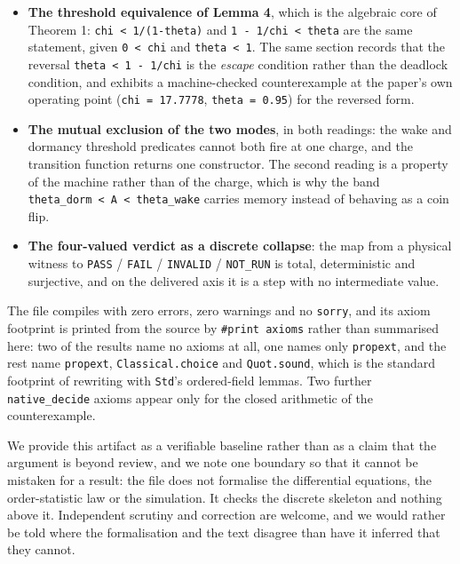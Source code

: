 \documentclass[11pt,a4paper]{article}
\providecommand{\tightlist}{\setlength{\itemsep}{0pt}\setlength{\parskip}{0pt}}
\begin{document}
\begin{itemize}
\tightlist
\item
  \textbf{The threshold equivalence of Lemma 4}, which is the algebraic core of
  Theorem 1: \texttt{chi\ \textless{}\ 1/(1-theta)} and \texttt{1\ -\ 1/chi\ \textless{}\ theta} are the same
  statement, given \texttt{0\ \textless{}\ chi} and \texttt{theta\ \textless{}\ 1}. The same section records that
  the reversal \texttt{theta\ \textless{}\ 1\ -\ 1/chi} is the \emph{escape} condition rather than the
  deadlock condition, and exhibits a machine-checked counterexample at the
  paper's own operating point (\texttt{chi\ =\ 17.7778}, \texttt{theta\ =\ 0.95}) for the
  reversed form.
\item
  \textbf{The mutual exclusion of the two modes}, in both readings: the wake and
  dormancy threshold predicates cannot both fire at one charge, and the
  transition function returns one constructor. The second reading is a
  property of the machine rather than of the charge, which is why the band
  \texttt{theta\_dorm\ \textless{}\ A\ \textless{}\ theta\_wake} carries memory instead of behaving as a coin
  flip.
\item
  \textbf{The four-valued verdict as a discrete collapse}: the map from a physical
  witness to \texttt{PASS} / \texttt{FAIL} / \texttt{INVALID} / \texttt{NOT\_RUN} is total, deterministic
  and surjective, and on the delivered axis it is a step with no intermediate
  value.
\end{itemize}

The file compiles with zero errors, zero warnings and no \texttt{sorry}, and its
axiom footprint is printed from the source by \texttt{\#print\ axioms} rather than
summarised here: two of the results name no axioms at all, one names only
\texttt{propext}, and the rest name \texttt{propext}, \texttt{Classical.choice} and \texttt{Quot.sound},
which is the standard footprint of rewriting with \texttt{Std}'s ordered-field
lemmas. Two further \texttt{native\_decide} axioms appear only for the closed
arithmetic of the counterexample.

We provide this artifact as a verifiable baseline rather than as a claim that
the argument is beyond review, and we note one boundary so that it cannot be
mistaken for a result: the file does not formalise the differential
equations, the order-statistic law or the simulation. It checks the discrete
skeleton and nothing above it. Independent scrutiny and correction are
welcome, and we would rather be told where the formalisation and the text
disagree than have it inferred that they cannot.
\end{document}
